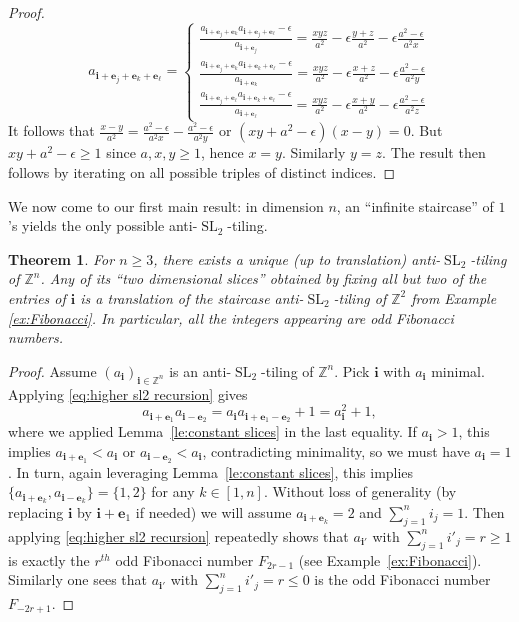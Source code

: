 \documentclass[12pt]{amsart}
\newtheorem{theorem}{Theorem}
\newcommand{\be}{\boldsymbol{e}}
\newcommand{\bi}{\boldsymbol{i}}
\newcommand{\SL}{\operatorname{SL}}
\newcommand{\ZZ}{\mathbb{Z}}
\begin{document}
\begin{proof}
\begin{equation*}
      a_{\bi+\be_j+\be_k+\be_\ell}=\left\{
        \begin{array}{l}
          \frac{a_{\bi+\be_j+\be_k}a_{\bi+\be_j+\be_\ell}-\epsilon}{a_{\bi+\be_j}}=\frac{xyz}{a^2}-\epsilon\frac{y+z}{a^2}-\epsilon\frac{a^2-\epsilon}{a^2x}\\
          \frac{a_{\bi+\be_j+\be_k}a_{\bi+\be_k+\be_\ell}-\epsilon}{a_{\bi+\be_k}}=\frac{xyz}{a^2}-\epsilon\frac{x+z}{a^2}-\epsilon\frac{a^2-\epsilon}{a^2y}\\
          \frac{a_{\bi+\be_j+\be_\ell}a_{\bi+\be_k+\be_\ell}-\epsilon}{a_{\bi+\be_\ell}}=\frac{xyz}{a^2}-\epsilon\frac{x+y}{a^2}-\epsilon\frac{a^2-\epsilon}{a^2z}
        \end{array}\right.
    \end{equation*}
    It follows that $\frac{x-y}{a^2}=\frac{a^2-\epsilon}{a^2x}-\frac{a^2-\epsilon}{a^2y}$ or $(xy+a^2-\epsilon)(x-y)=0$.  
    But $xy+a^2-\epsilon\ge1$ since $a,x,y\ge1$, hence $x=y$.  
    Similarly $y=z$.
    The result then follows by iterating on all possible triples of distinct indices.
  \end{proof}

  We now come to our first main result: in dimension $n$, an ``infinite staircase'' of $1$'s yields the only possible anti-$\SL_2$-tiling.

  \begin{theorem} 
    \label{thm:antitiling}
    For $n\ge3$, there exists a unique (up to translation) anti-$\SL_2$-tiling of $\ZZ^n$. 
    Any of its ``two dimensional slices'' obtained by fixing all but two of the entries of $\bi$ is a translation of the staircase anti-$\SL_2$-tiling of $\ZZ^2$ from Example \ref{ex:Fibonacci}.
    In particular, all the integers appearing are odd Fibonacci numbers.
  \end{theorem}  
  \begin{proof}
    Assume $(a_{\bi})_{\bi\in\ZZ^n}$ is an anti-$\SL_2$-tiling of $\ZZ^n$.  
    Pick $\bi$ with $a_{\bi}$ minimal.  
    Applying \eqref{eq:higher sl2 recursion} gives
    \[
      a_{\bi+\be_1}a_{\bi-\be_2}=a_{\bi}a_{\bi+\be_1-\be_2}+1=a_{\bi}^2+1,
    \]
    where we applied Lemma~\ref{le:constant slices} in the last equality.
    If $a_{\bi}>1$, this implies $a_{\bi+\be_1}<a_{\bi}$ or $a_{\bi-\be_2}<a_{\bi}$, contradicting minimality, so we must have $a_{\bi}=1$.
    In turn, again leveraging Lemma~\ref{le:constant slices}, this implies $\{a_{\bi+\be_k},a_{\bi-\be_k}\}=\{1,2\}$ for any $k\in[1,n]$.
    Without loss of generality (by replacing $\bi$ by $\bi+\be_1$ if needed) we will assume $a_{\bi+\be_k}=2$ and $\sum_{j=1}^n i_j=1$.
    Then applying \eqref{eq:higher sl2 recursion} repeatedly shows that $a_{\bi'}$ with $\sum_{j=1}^n i'_j=r\ge1$ is exactly the $r^{th}$ odd Fibonacci number $F_{2r-1}$ (see Example~\ref{ex:Fibonacci}).
    Similarly one sees that $a_{\bi'}$ with $\sum_{j=1}^n i'_j =r\le0$ is the odd Fibonacci number $F_{-2r+1}$.
  \end{proof}
\end{document}
